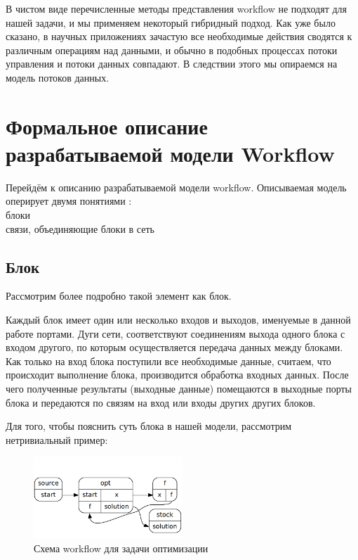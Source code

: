 \documentclass[a4paper,14pt]{article}
\begin{document}
В чистом виде перечисленные методы представления workflow не подходят для нашей задачи, и мы применяем некоторый гибридный подход.
 Как уже было сказано, в научных приложениях зачастую все необходимые действия сводятся к различным операциям над данными, и обычно в подобных процессах потоки управления и потоки данных совпадают. В следствии этого мы опираемся на модель потоков данных.
 
 
  
 
\section{Формальное описание разрабатываемой модели Workflow}
Перейдём к описанию разрабатываемой модели workflow.
Описываемая модель оперирует двумя понятиями : \\
блоки \\
связи, объединяющие блоки в сеть\\

\subsection{Блок}


Рассмотрим более подробно такой элемент как блок.

Каждый блок имеет один или несколько входов и выходов, именуемые в данной работе портами. Дуги сети, соответствуют соединениям выхода одного
блока с входом другого, по которым осуществляется передача данных
между блоками. Как только на вход блока поступили все необходимые данные, считаем, что происходит выполнение блока, производится обработка входных данных. После чего полученные результаты (выходные данные) помещаются в выходные порты блока и передаются по связям на вход или входы других других блоков. 

Для того, чтобы пояснить суть блока в нашей модели, рассмотрим нетривиальный пример:

\begin{figure}[here]
    \centering
    \includegraphics[width=0.5\textwidth]{optimization_workflow.png}
    \caption{Схема workflow для задачи оптимизации}
    \label{img:opt_wf}
\end{figure}
\end{document}
